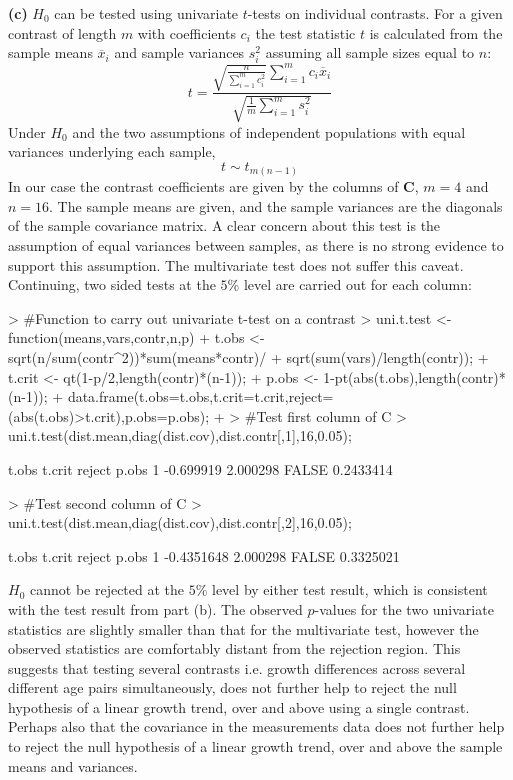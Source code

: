 \documentclass[a4paper,11pt]{article}
\begin{document}
{\bf (c)} $H_0$ can be tested using univariate $t$-tests on individual contrasts. For a given contrast of length $m$ with coefficients $c_i$ the test statistic $t$ is calculated from the sample means $\overline{x}_i$ and sample variances $s_i^2$ assuming all sample sizes equal to $n$:
\begin{equation}
t=\frac{\sqrt{\frac{n}{\sum_{i=1}^{m}c_i^2}}\sum_{i=1}^{m}c_i\overline{x}_i}
       {\sqrt{\frac{1}{m}\sum_{i=1}^{m}s_i^2}}
\label{unittest}
\end{equation}
Under $H_0$ and the two assumptions of independent populations with equal variances underlying each sample,
\begin{equation}
t \sim t_{m(n-1)}
\end{equation}
In our case the contrast coefficients are given by the columns of $\mathbf{C}$, $m=4$ and $n=16$. The sample means are given, and the sample variances are the diagonals of the sample covariance matrix. A clear concern about this test is the assumption of equal variances between samples, as there is no strong evidence to support this assumption. The multivariate test does not suffer this caveat. Continuing, two sided tests at the $5$\% level are carried out for each column:
\begin{Schunk}
\begin{Sinput}
> #Function to carry out univariate t-test on a contrast
> uni.t.test <- function(means,vars,contr,n,p) {
+   t.obs <- sqrt(n/sum(contr^2))*sum(means*contr)/
+            sqrt(sum(vars)/length(contr));
+   t.crit <- qt(1-p/2,length(contr)*(n-1));
+   p.obs <- 1-pt(abs(t.obs),length(contr)*(n-1));
+   data.frame(t.obs=t.obs,t.crit=t.crit,reject=(abs(t.obs)>t.crit),p.obs=p.obs);
+ }
> #Test first column of C
> uni.t.test(dist.mean,diag(dist.cov),dist.contr[,1],16,0.05);
\end{Sinput}
\begin{Soutput}
      t.obs   t.crit reject     p.obs
1 -0.699919 2.000298  FALSE 0.2433414
\end{Soutput}
\begin{Sinput}
> #Test second column of C
> uni.t.test(dist.mean,diag(dist.cov),dist.contr[,2],16,0.05);
\end{Sinput}
\begin{Soutput}
       t.obs   t.crit reject     p.obs
1 -0.4351648 2.000298  FALSE 0.3325021
\end{Soutput}
\end{Schunk}

$H_0$ cannot be rejected at the $5$\% level by either test result, which is consistent with the test result from part (b). The observed $p$-values for the two univariate statistics are slightly smaller than that for the multivariate test, however the observed statistics are comfortably distant from the rejection region. This suggests that testing several contrasts i.e. growth differences across several different age pairs simultaneously, does not further help to reject the null hypothesis of a linear growth trend, over and above using a single contrast. Perhaps also that the covariance in the measurements data does not further help to reject the null hypothesis of a linear growth trend, over and above the sample means and variances.
\end{document}
